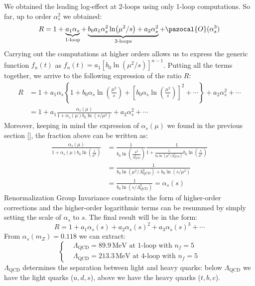 \documentclass[../main.tex]{subfiles}
\begin{document}
We obtained the leading log-effect at 2-loops using only 1-loop computations. So far, up to order $\alpha_s^2$ we obtained:
\[
R=1+\underbrace{a_1\alpha_s}_{\text{1-loop}}+\underbrace{b_0a_1\alpha_s^2\ln(\mu^2/s)+a_2\alpha_s^2}_{\text{2-loops}}+\pazocal{O}(\alpha_s^3)
\]
Carrying out the computations at higher orders allows us to express the generic function $f_n(t)$ as $f_n(t)=a_1[b_0\ln(\mu^2/s)]^{n-1}$. Putting all the terms together, we arrive to the following expression of the ratio $R$:
\begin{align*}
R&=1+a_1\alpha_s\left\{1+b_0\alpha_s\ln\left(\frac{\mu^2}{s}\right)+\left[b_0\alpha_s\ln\left(\frac{\mu^2}{s}\right)\right]^2+\cdots\right\}+a_2\alpha_s^2+\cdots\\
&=1+a_1\frac{\alpha_s(\mu)}{1+\alpha_s(\mu)b_0\ln(s/\mu^2)}+a_2\alpha_s^2+\cdots
\end{align*}
Moreover, keeping in mind the expression of $\alpha_s(\mu)$ we found in the previous section [], the fraction above can be written as:
\begin{align*}
\frac{\alpha_s(\mu)}{1+\alpha_s(\mu)b_0\ln\left(\frac{s}{\mu^2}\right)}&=\frac{1}{b_0\ln\left(\frac{\mu^2}{\Lambda_{\text{QCD}}^2}\right)}\frac{1}{1+\frac{1}{b_0\ln(\mu^2/\Lambda_{\text{QCD}}^2)}b_0\ln\left(\frac{s}{\mu^2}\right)}\\
&=\frac{1}{b_0\ln(\mu^2/\Lambda_{\text{QCD}}^2)+b_0\ln(s/\mu^2)}\\
&=\frac{1}{b_0\ln(s/\Lambda_{\text{QCD}}^2)}=\alpha_s(s)
\end{align*}
Renormalization Group Invariance constraints the form of higher-order corrections and the higher-order logarithmic terms can be resummed by simply setting the scale of $\alpha_s$ to $s$. The final result will be in the form:
\[
R=1+a_1\alpha_s(s)+a_2\alpha_s(s)^2+a_3\alpha_s(s)^3+\cdots
\]
From $\alpha_s(m_Z)=0.118$ we can extract:
\[
\left\{
\begin{aligned}
&\Lambda_{\text{QCD}}=89.9\,\text{MeV at 1-loop with $n_f=5$}\\
&\Lambda_{\text{QCD}}=213.3\,\text{MeV at 4-loop with $n_f=5$}
\end{aligned}
\right.
\]
$\Lambda_{\text{QCD}}$ determines the separation between light and heavy quarks: below $\Lambda_{\text{QCD}}$ we have the light quarks ($u, d, s$), above we have the heavy quarks ($t, b, c$).
\end{document}
